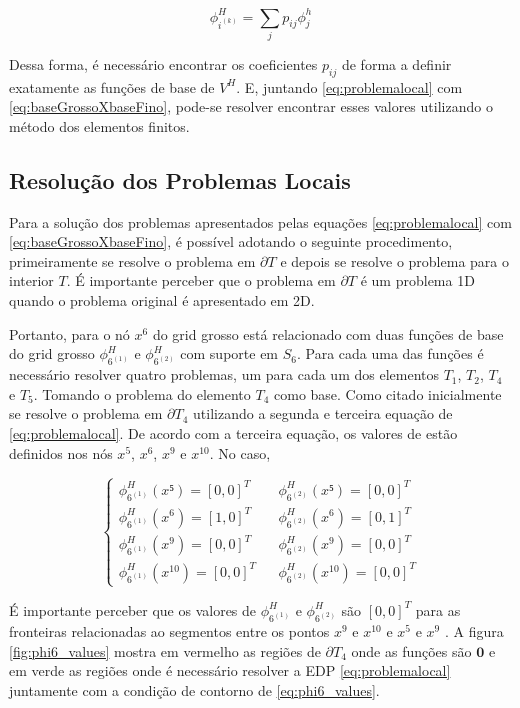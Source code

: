\documentclass{article}
\begin{document}
\begin{equation} \label{eq:baseGrossoXbaseFino}
    \phi^H_{i^{(k)}} = \sum_{j} p_{ij} \phi^h_{j}
\end{equation}

Dessa forma, é necessário encontrar os coeficientes $p_{ij}$ de forma a definir exatamente as funções de base de $V^H$. E, juntando \ref{eq:problemalocal} com \ref{eq:baseGrossoXbaseFino}, pode-se resolver encontrar esses valores utilizando o método dos elementos finitos.


\subsection{Resolução dos Problemas Locais}

Para a solução dos problemas apresentados pelas equações \ref{eq:problemalocal} com \ref{eq:baseGrossoXbaseFino}, é possível adotando o seguinte procedimento, primeiramente se resolve o problema em $\partial T$ e depois se resolve o problema para o interior $T$. É importante perceber que o problema em $\partial T$ é um problema 1D quando o problema original é apresentado em 2D. 


Portanto, para o nó $x^6$ do grid grosso está relacionado com duas funções de base do grid grosso $\phi^H_{6^{(1)}}$ e  $\phi^H_{6^{(2)}}$  com suporte em $S_6$. Para cada uma das funções é necessário resolver quatro problemas, um para cada um dos elementos $T_1$, $T_2$, $T_4$ e $T_5$. Tomando o problema do elemento $T_4$ como base. Como citado inicialmente se resolve o problema em $\partial T_4$ utilizando a segunda e terceira equação de \ref{eq:problemalocal}. De acordo com a terceira equação, os valores de estão definidos nos nós $x^5$, $x^6$, $x^9$ e $x^{10}$. No caso,


\begin{equation}
    \left\{\begin{matrix} \label{eq:phi6_values}
\phi^H_{6^{(1)}} (x⁵) = [0, 0]^T && \phi^H_{6^{(2)}} (x⁵) = [0, 0]^T
\\ 
\phi^H_{6^{(1)}} (x^6) = [1, 0]^T && \phi^H_{6^{(2)}} (x^6) = [0, 1]^T
\\ 
\phi^H_{6^{(1)}}(x^9) = [0, 0]^T && \phi^H_{6^{(2)}} (x^9 ) = [0, 0]^T
\\
\phi^H_{6^{(1)}}(x^{10}) = [0, 0]^T && \phi^H_{6^{(2)}} (x^{10}) = [0, 0]^T
\end{matrix}\right.
\end{equation}

É importante perceber que os valores de $\phi^H_{6^{(1)}}$ e $\phi^H_{6^{(2)}}$ são $ [0, 0] ^T  $ para as fronteiras relacionadas ao segmentos entre os pontos $x^9$ e $x^{10}$ e $x^5$ e $x^9$ . A figura \ref{fig:phi6_values} mostra em vermelho as regiões de $\partial T_4 $ onde as funções são $\mathbf{0}$  e em verde as regiões onde é necessário resolver a EDP \ref{eq:problemalocal} juntamente com a condição de contorno de \ref{eq:phi6_values}.
\end{document}
